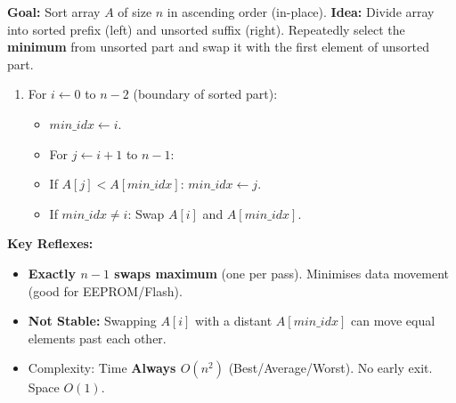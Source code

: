 \documentclass[11pt]{article}
\begin{document}
\begin{methode}
    \textbf{Goal:} Sort array $A$ of size $n$ in ascending order (in-place).
    \textbf{Idea:} Divide array into sorted prefix (left) and unsorted suffix (right). Repeatedly select the \textbf{minimum} from unsorted part and swap it with the first element of unsorted part.
    \begin{enumerate}
        \item For $i \leftarrow 0$ to $n-2$ (boundary of sorted part):
            \begin{itemize}
                \item $min\_idx \leftarrow i$.
                \item For $j \leftarrow i+1$ to $n-1$:
                    \item If $A[j] < A[min\_idx]$: $min\_idx \leftarrow j$.
                \item If $min\_idx \ne i$: Swap $A[i]$ and $A[min\_idx]$.
            \end{itemize}
    \end{enumerate}
    \textbf{Key Reflexes:}
    \begin{itemize}
        \item \textbf{Exactly $n-1$ swaps maximum} (one per pass). Minimises data movement (good for EEPROM/Flash).
        \item \textbf{Not Stable:} Swapping $A[i]$ with a distant $A[min\_idx]$ can move equal elements past each other.
        \item Complexity: Time \textbf{Always $O(n^2)$} (Best/Average/Worst). No early exit. Space $O(1)$.
    \end{itemize}
\end{methode}
\end{document}
